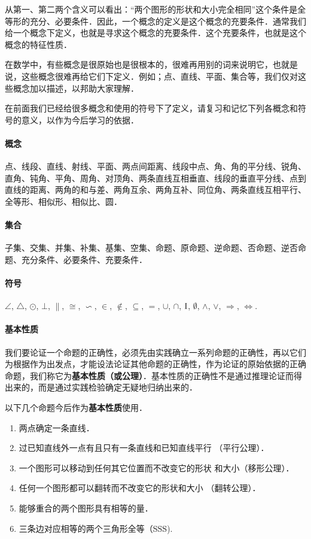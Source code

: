从第一、第二两个含义可以看出：“两个图形的形状和大小完全相同”这个条件是全等形的充分、必要条件．因此，一个概念的定义是这个概念的充要条件．通常我们给一个概念下定义，也就是寻求这个概念的充要条件．这个充要条件，也就是这个概念的特征性质．

在数学中，有些概念是很原始也是很根本的，很难再用别的词来说明它，也就是说，这些概念很难再给它们下定义．例如；点、直线、平面、集合等，我们仅对这些概念加以描述，以邦助大家理解．

在前面我们已经给很多概念和使用的符号下了定义，请复习和记忆下列各概念和符号的意义，以作为今后学习的依据．

\paragraph{概念} 点、线段、直线、射线、平面、两点间距离、线段中点、角、角的平分线、锐角、直角、钝角、平角、周角、对顶角、两条直线互相垂直、线段的垂直平分线、点到直线的距离、两角的和与差、两角互余、两角互补、同位角、两条直线互相平行、全等形、相似形、相似比、圆．

\paragraph{集合} 子集、交集、并集、补集、基集、空集、命题、原命题、逆命题、否命题、逆否命题、充分条件、必要条件、充要条件．

\paragraph{符号} $\angle$, $\triangle$, $\odot$, $\bot$, $\parallel$, $\cong$, $\backsim$, $\in$, $\notin$, $\subseteq$, $=$, $\cup$, $\cap$, ${\rm I}$, $\emptyset$, $\wedge$, $\vee$, $\Rightarrow$, $\Leftrightarrow$.

\paragraph{基本性质}

我们要论证一个命题的正确性，必须先由实践确立一系列命题的正确性，再以它们为根据作为出发点，才能设法论证其他命题的正确性，作为论证的原始依据的正确命题，我们称它为\textbf{基本性质（或公理）}．基本性质的正确性不是通过推理论证而得出来的，而是通过实践检验确定无疑地归纳出来的．

以下几个命题今后作为\textbf{基本性质}使用．

\begin{enumerate}
\item 两点确定一条直线．
\item 过已知直线外一点有且只有一条直线和已知直线平行
（平行公理）．
\item 一个图形可以移动到任何其它位置而不改变它的形状
和大小（移形公理）．
\item 任何一个图形都可以翻转而不改变它的形状和大小
（翻转公理）．
\item 能够重合的两个图形具有相等的量．
\item  三条边对应相等的两个三角形全等（SSS).
\end{enumerate}

